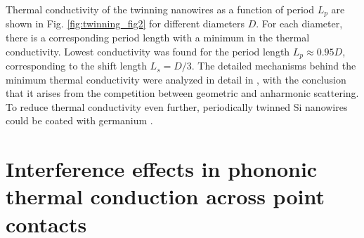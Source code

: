 Thermal conductivity of the twinning nanowires as a function of period $L_p$ are shown in Fig. \ref{fig:twinning_fig2} for different diameters $D$. For each diameter, there is a corresponding period length with a minimum in the thermal conductivity. Lowest conductivity was found for the period length $L_p\approx 0.95D$, corresponding to the shift length $L_s=D/3$. The detailed mechanisms behind the minimum thermal conductivity were analyzed in detail in , with the conclusion that it arises from the competition between geometric and anharmonic scattering. To reduce thermal conductivity even further, periodically twinned Si nanowires could be coated with germanium \cite{hu11}. %




\section{Interference effects in phononic thermal conduction across point contacts}
\label{sec:results_interference}


